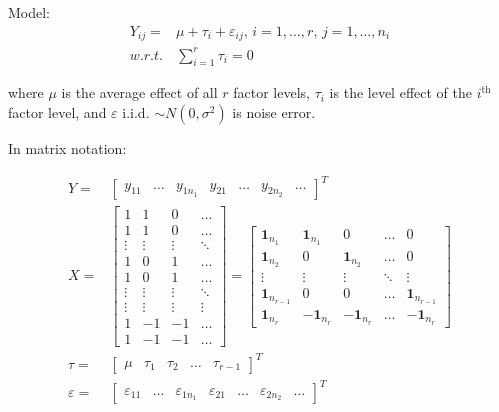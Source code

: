     Model:
    \begin{align}
        Y_{ij}=&\mu +\tau_i+\varepsilon _{ij} ,\, i=1,\ldots,r,\, j=1,\ldots,n_i\\
        w.r.t.&\sum_{i=1}^r \tau_i=0
    \end{align}
    
    where $ \mu  $ is the average effect of all $ r $ factor levels, $ \tau_i $ is the level effect of the $ i^\mathrm{th}  $ factor level, and $ \varepsilon  $ i.i.d. $ \sim N(0,\sigma ^2) $ is noise error.
    
    In matrix notation:

    \begin{subequations}\label{EqaFactorAnalysisModel}
        \begin{align}
            Y=&\begin{bmatrix}
        y_{11}&\ldots& y_{1n_1}&y_{21}&\ldots &y_{2n_2}&\ldots
        \end{bmatrix}^T\\
            X=&\begin{bmatrix}
            1&1&0&\ldots\\
            1&1&0&\ldots\\
            \vdots&\vdots&\vdots&\ddots\\
            1&0&1&\ldots\\
            1&0&1&\ldots\\
            \vdots&\vdots&\vdots&\ddots\\
            \vdots&\vdots&\vdots&\vdots\\
            1&-1&-1&\ldots\\
            1&-1&-1&\ldots
        \end{bmatrix}=
        \begin{bmatrix}
            \mathbf{1}_{n_1}&\mathbf{1}_{n_1}&0&\ldots &0\\
            \mathbf{1}_{n_2}&0&\mathbf{1}_{n_2}&\ldots &0\\
            \vdots&\vdots&\vdots&\ddots&\vdots\\
            \mathbf{1}_{n_{r-1}}&0&0&\ldots&\mathbf{1}_{n_{r-1}}\\
            \mathbf{1}_{n_r}&-\mathbf{1}_{n_r}&-\mathbf{1}_{n_r}&\ldots&-\mathbf{1}_{n_r}
        \end{bmatrix}\\
        \tau=&\begin{bmatrix}
            \mu&\tau_1&\tau_2&\ldots&\tau_{r-1}
        \end{bmatrix}^T\\
        \varepsilon =&\begin{bmatrix}
            \varepsilon _{11}&\ldots&\varepsilon _{1n_1}&\varepsilon _{21}&\ldots&\varepsilon _{2n_2}&\ldots
                \end{bmatrix}^T
        \end{align}
    \end{subequations}

